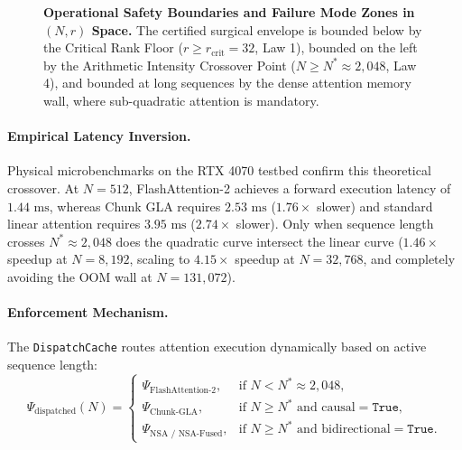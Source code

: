 \begin{figure}[t]
{%
}
\caption[Operational Safety Boundaries and Failure Mode Zones in (N, r) Space]{\textbf{Operational Safety Boundaries and Failure Mode Zones in $(N, r)$ Space.} The certified surgical envelope is bounded below by the Critical Rank Floor ($r \ge r_{\text{crit}} = 32$, Law 1), bounded on the left by the Arithmetic Intensity Crossover Point ($N \ge N^* \approx 2{,}048$, Law 4), and bounded at long sequences by the dense attention memory wall, where sub-quadratic attention is mandatory.}
\label{fig:safety_boundaries}
\end{figure}

\paragraph{Empirical Latency Inversion.}
Physical microbenchmarks on the RTX 4070 testbed confirm this theoretical crossover. At $N = 512$, FlashAttention-2 achieves a forward execution latency of $1.44\text{ ms}$, whereas Chunk GLA requires $2.53\text{ ms}$ ($1.76\times$ slower) and standard linear attention requires $3.95\text{ ms}$ ($2.74\times$ slower). Only when sequence length crosses $N^* \approx 2{,}048$ does the quadratic curve intersect the linear curve ($1.46\times$ speedup at $N = 8{,}192$, scaling to $4.15\times$ speedup at $N = 32{,}768$, and completely avoiding the OOM wall at $N = 131{,}072$).

\paragraph{Enforcement Mechanism.}
The \texttt{DispatchCache} routes attention execution dynamically based on active sequence length:
\begin{equation}
\Psi_{\text{dispatched}}(N) = 
\begin{cases} 
\Psi_{\text{FlashAttention-2}}, & \text{if } N < N^* \approx 2{,}048, \\
\Psi_{\text{Chunk-GLA}}, & \text{if } N \ge N^* \text{ and causal}=\mathtt{True}, \\
\Psi_{\text{NSA / NSA-Fused}}, & \text{if } N \ge N^* \text{ and bidirectional}=\mathtt{True}.
\end{cases}
\end{equation}

